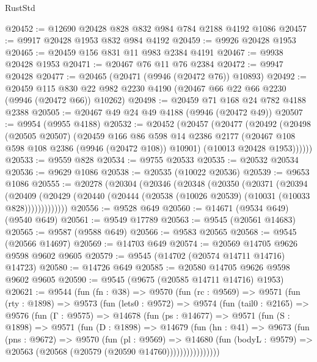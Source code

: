 \begin{lexlean}{RustStd}
\begin{coremodule}
@20452 := @12690 @20428 @828 @832 @984 @784 @2188 @4192 @1086
@20457 := @9917 @20428 @1953 @832 @984 @4192
@20459 := @9926 @20428 @1953
@20465 := @20459 @156 @831 @11 @983 @2384 @4191
@20467 := @9938 @20428 @1953
@20471 := @20467 @76 @11 @76 @2384
@20472 := @9947 @20428
@20477 := @20465 (@20471 (@9946 (@20472 @76)) @10893)
@20492 := @20459
    @115
    @830
    @22
    @982
    @2230
    @4190
    (@20467 @66 @22 @66 @2230 (@9946 (@20472 @66)) @10262)
@20498 := @20459 @71 @168 @24 @782 @4188 @2388
@20505 := @20467 @49 @24 @49 @4188 (@9946 (@20472 @49))
@20507 := @9954 (@9955 @4188)
@20532 := @20452
    (@20457
      (@20477
        (@20492
          (@20498
            (@20505 @20507)
            (@20459
              @166
              @86
              @598
              @14
              @2386
              @2177
              (@20467 @108 @598 @108 @2386 (@9946 (@20472 @108)) @10901)
              (@10013 @20428 @1953))))))
@20533 := @9559 @828
@20534 := @9755 @20533
@20535 := @20532 @20534
@20536 := @9629 @1086
@20538 := @20535 (@10022 @20536)
@20539 := @9653 @1086
@20555 := @20278
    (@20304
      (@20346
        (@20348
          (@20350
            (@20371
              (@20394
                (@20409
                  (@20429 (@20440 (@20444 (@20538 (@10026 @20539) (@10031 (@10033 @828)))))))))))))
@20556 := @9528 @649
@20560 := @14671 (@9534 @649) (@9540 @649)
@20561 := @9549 @17789
@20563 := @9545 (@20561 @14683)
@20565 := @9587 (@9588 @649)
@20566 := @9583 @20565
@20568 := @9545 (@20566 @14697)
@20569 := @14703 @649
@20574 := @20569 @14705 @9626 @9598 @9602 @9605
@20579 := @9545 (@14702 (@20574 @14711 @14716) @14723)
@20580 := @14726 @649
@20585 := @20580 @14705 @9626 @9598 @9602 @9605
@20590 := @9545 (@9675 (@20585 @14711 @14716) @1953)
@20621 := @9544
    (fun (fn : @38) =>
    @9570
      (fun (rc : @9569) =>
      @9571
        (fun (rty : @1898) =>
        @9573
          (fun (lets0 : @9572) =>
          @9574
            (fun (tail0 : @2165) =>
            @9576
              (fun (Γ : @9575) =>
              @14678
                (fun (ps : @14677) =>
                @9571
                  (fun (S : @1898) =>
                  @9571
                    (fun (D : @1898) =>
                    @14679
                      (fun (hn : @41) =>
                      @9673
                        (fun (pns : @9672) =>
                        @9570
                          (fun (pl : @9569) =>
                          @14680
                            (fun (bodyL : @9579) =>
                            @20563 (@20568 (@20579 (@20590 @14760))))))))))))))))

\end{coremodule}
\end{lexlean}
